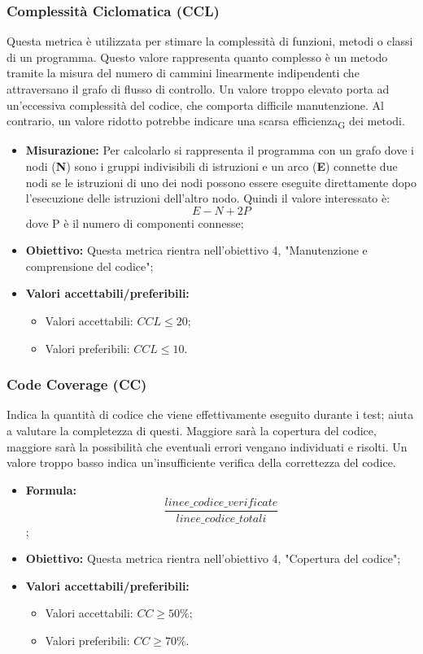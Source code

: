 \subsubsection{Complessità Ciclomatica (CCL)}
Questa metrica è utilizzata per stimare la complessità di funzioni, metodi o classi di un programma. Questo valore rappresenta quanto complesso è un metodo tramite la misura del numero di cammini linearmente indipendenti che attraversano il grafo di flusso di controllo. Un valore troppo elevato porta ad un'eccessiva complessità del codice, che comporta difficile manutenzione. Al contrario, un valore ridotto potrebbe indicare una scarsa efficienza\textsubscript{G} dei metodi.
\begin{itemize}
	\item \textbf{Misurazione:}  Per calcolarlo si rappresenta il programma con un grafo dove i  nodi (\textbf{N}) sono i gruppi indivisibili di istruzioni e un arco (\textbf{E}) connette due nodi se le istruzioni di uno dei nodi possono essere eseguite direttamente dopo l'esecuzione delle istruzioni dell'altro nodo. Quindi il valore interessato è:
	\[E-N+2P\]
	dove P è il numero di componenti connesse;
	\item \textbf{Obiettivo:} Questa metrica rientra nell'obiettivo 4, "Manutenzione e comprensione del codice";
	\item \textbf{Valori accettabili/preferibili: }
	\begin{itemize}
		\item Valori accettabili: $CCL \leq 20$;
		\item Valori preferibili: $CCL \leq 10$.
	\end{itemize}
\end{itemize}
\subsubsection{Code Coverage (CC)}
Indica la quantità di codice che viene effettivamente eseguito durante i test; aiuta a valutare la completezza di questi. Maggiore sarà la copertura del codice, maggiore sarà la possibilità che eventuali errori vengano individuati e risolti. Un valore troppo basso indica un'insufficiente verifica della correttezza del codice.
\begin{itemize}
	\item \textbf{Formula:} \[\frac{linee\_codice\_verificate}{linee\_codice\_totali}\];
	\item \textbf{Obiettivo:} Questa metrica rientra nell'obiettivo 4, "Copertura del codice";
	\item \textbf{Valori accettabili/preferibili: }
	\begin{itemize}
		\item Valori accettabili: $CC \geq 50\%$;
		\item Valori preferibili: $CC \geq 70\%$.
	\end{itemize}
\end{itemize}


